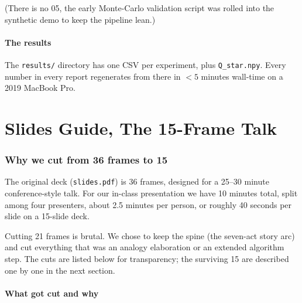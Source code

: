 \documentclass[11pt]{article}
\begin{document}
(There is no 05, the early Monte-Carlo validation script was rolled into the synthetic demo to keep the pipeline lean.)

\subsection{The results}

The \texttt{results/} directory has one CSV per experiment, plus \texttt{Q\_star.npy}. Every number in every report regenerates from there in $<5$ minutes wall-time on a 2019 MacBook Pro.

\part{Slides Guide, The 15-Frame Talk}

\section{Why we cut from 36 frames to 15}

The original deck (\texttt{slides.pdf}) is 36 frames, designed for a 25--30 minute conference-style talk. For our in-class presentation we have 10 minutes total, split among four presenters, about 2.5 minutes per person, or roughly 40 seconds per slide on a 15-slide deck.

Cutting 21 frames is brutal. We chose to keep the spine (the seven-act story arc) and cut everything that was an analogy elaboration or an extended algorithm step. The cuts are listed below for transparency; the surviving 15 are described one by one in the next section.

\subsection{What got cut and why}
\end{document}
